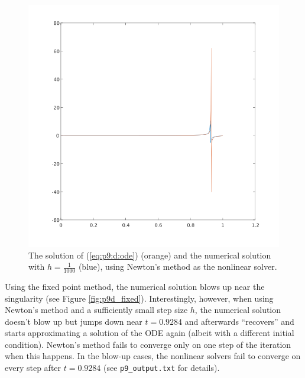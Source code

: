 \documentclass{homework}
\begin{document}
\begin{alphaparts}
			\begin{figure}[H]
				\centering
				\includegraphics[width=\linewidth]{plot_p9d_h1000.png}
				\caption{The solution of (\ref{eq:p9:d:ode}) (orange) and the numerical solution with $h=\frac{1}{1000}$ (blue), using Newton's method as the nonlinear solver.}
				\label{fig:p9d_h1000}
			\end{figure}
			
			Using the fixed point method, the numerical solution blows up near the singularity (see Figure \ref{fig:p9d_fixed}). Interestingly, however, when using Newton's method and a sufficiently small step size $h$, the numerical solution doesn't blow up but jumps down near $t=0.9284$ and afterwards ``recovers'' and starts approximating a solution of the ODE again (albeit with a different initial condition). Newton's method fails to converge only on one step of the iteration when this happens. In the blow-up cases, the nonlinear solvers fail to converge on every step after $t=0.9284$ (see \verb*|p9_output.txt| for details).
			

\end{alphaparts}
\end{document}
